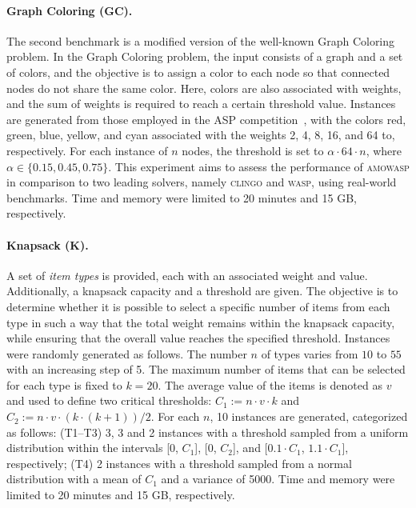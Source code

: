 \paragraph{Graph Coloring (GC).}%
The second benchmark is a modified version of the well-known Graph Coloring problem. 
In the Graph Coloring problem, the input consists of a graph and a set of colors, and the objective 
is to assign a color to each node so that connected nodes do not share the same color.
Here, colors are also associated with weights, and the sum of weights is required to reach a certain threshold value.
Instances are generated from those employed in the ASP competition~\cite{DBLP:journals/ai/CalimeriGMR16}, 
with the colors red, green, blue, yellow, and cyan associated with the weights 2, 4, 8, 16, and 64 to, respectively.
For each instance of $n$ nodes, the threshold is set to $\alpha \cdot 64 \cdot n$, where $\alpha \in \{0.15, 0.45, 0.75\}$.
This experiment aims to assess the performance of \textsc{amowasp} in comparison to two leading solvers, 
namely \textsc{clingo} and \textsc{wasp}, using real-world benchmarks. 
Time and memory were limited to 20 minutes and 15 GB, respectively.

\paragraph{Knapsack (K).}
A set of \emph{item types} is provided, each with an associated weight and value. 
Additionally, a knapsack capacity and a threshold are given. 
The objective is to determine whether it is possible to select a specific number of items 
from each type in such a way that the total weight remains within the knapsack capacity, 
while ensuring that the overall value reaches the specified threshold.
Instances were randomly generated as follows.
The number $n$ of types varies from $10$ to $55$ with an increasing step of 5.
The maximum number of items that can be selected for each type is fixed to $k = 20$.
The average value of the items is denoted as $v$ and used to define two critical thresholds:
$C_1 := n \cdot v \cdot k$ and $C_2 := n \cdot v \cdot (k \cdot (k+1)) / 2$. 
For each $n$, 10 instances are generated, categorized as follows:
(T1--T3) 3, 3 and 2 instances with a threshold sampled from a uniform distribution 
within the intervals [0, $C_1$], [0, $C_2$], and [$0.1 \cdot C_1$, $1.1 \cdot C_1$], respectively;
(T4) 2 instances with a threshold sampled from a normal distribution with a mean of $C_1$ and a variance of 5000.
Time and memory were limited to 20 minutes and 15 GB, respectively.

